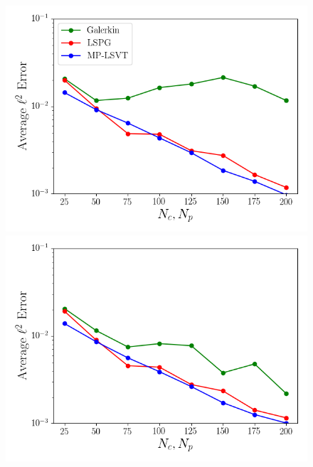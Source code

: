 \begin{figure}
	\begin{minipage}{0.49\linewidth}
		\includegraphics[width=0.99\linewidth]{Chapters/HPROMResults/Images/cavity/unsampled/unsampled_dt1e-6_Average_errorRaw.png}
		\subcaption{$\dt = \dtFOM$}
	\end{minipage}
	\begin{minipage}{0.49\linewidth}
		\includegraphics[width=0.99\linewidth]{Chapters/HPROMResults/Images/cavity/unsampled/unsampled_dt2p5e-6_Average_errorRaw.png}
		\subcaption{$\dt = 2.5 \times \dtFOM$}
	\end{minipage}


\end{figure}
